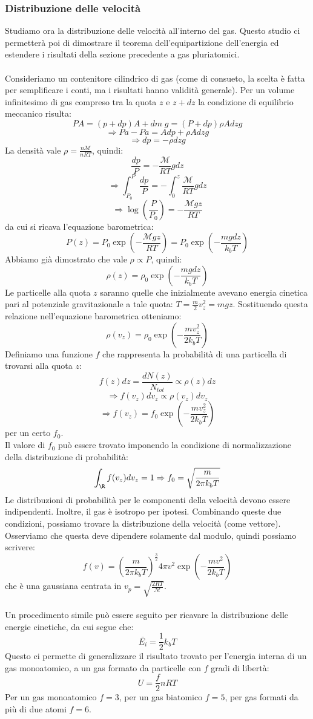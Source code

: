 \documentclass{article}
\begin{document}
\subsubsection{Distribuzione delle velocità}
Studiamo ora la distribuzione delle velocità all'interno del gas. Questo studio ci permetterà poi di dimostrare il teorema dell'equipartizione dell'energia ed estendere i risultati della sezione precedente a gas pluriatomici.\\\\
Consideriamo un contenitore cilindrico di gas (come di consueto, la scelta è fatta per semplificare i conti, ma i risultati hanno validità generale). Per un volume infinitesimo di gas compreso tra la quota $z$ e $z+dz$ la condizione di equilibrio meccanico risulta:
$$ PA=(p+dp)A+dm\;g = (P+dp)\rho Adzg $$
$$ \Rightarrow Pa-Pa = Adp+\rho Adzg$$
$$ \Rightarrow dp = -\rho dzg $$
La densità vale $ \rho=\frac{n\mathcal{M}}{nRT} $, quindi:
$$ \frac{dp}{P} = -\frac{\mathcal{M}}{RT}gdz $$
$$\Rightarrow \int_{P_0}^P\frac{dp}{P}=-\int_0^z\frac{\mathcal{M}}{RT}gdz  $$
$$\Rightarrow \log\left(\frac{P}{P_0}\right)=-\frac{\mathcal{M}gz}{RT} $$
da cui si ricava l'equazione barometrica:
$$P(z)=P_0\exp\left(-\frac{\mathcal{M}gz}{RT}\right)=P_0\exp\left(-\frac{mgdz}{k_bT}\right)$$
Abbiamo già dimostrato che vale $\rho\propto P$, quindi:
$$ \rho(z)=\rho_0\exp\left(-\frac{mgdz}{k_bT}\right)$$
Le particelle alla quota $z$ saranno quelle che inizialmente avevano energia cinetica pari al potenziale gravitazionale a tale quota: $T=\frac{m}{2}v_z^2=mgz$. Sostituendo questa relazione nell'equazione barometrica otteniamo:
$$ \rho(v_z)=\rho_0\exp\left(-\frac{mv_z^2}{2k_bT}\right) $$
Definiamo una funzione $f$ che rappresenta la probabilità di una particella di trovarsi alla quota $z$: $$f(z)dz=\frac{dN(z)}{N_{tot}}\propto\rho(z)dz$$
$$\Rightarrow f(v_z)dv_z\propto\rho(v_z)dv_z $$
$$\Rightarrow f(v_z)=f_0\exp\left(-\frac{mv_z^2}{2k_bT}\right) $$
per un certo $f_0$.\\
Il valore di $f_0$ può essere trovato imponendo la condizione di normalizzazione della distribuzione di probabilità:
$$ \int_\R f(v_z)dv_z=1\Rightarrow f_0=\sqrt{\frac{m}{2\pi k_bT}} $$
Le distribuzioni di probabilità per le componenti della velocità devono essere indipendenti. Inoltre, il gas è isotropo per ipotesi. Combinando queste due condizioni, possiamo trovare la distribuzione della velocità (come vettore). Osserviamo che questa deve dipendere solamente dal modulo, quindi possiamo scrivere:
$$ f(v)=\left(\frac{m}{2\pi k_bT}\right)^{\frac{3}{2}}4\pi v^2\exp\left(-\frac{mv^2}{2k_bT}\right) $$
che è una gaussiana centrata in $v_p=\sqrt{\frac{2RT}{\mathcal{M}}}$.\\\\
Un procedimento simile può essere seguito per ricavare la distribuzione delle energie cinetiche, da cui segue che:
$$ \bar{E_i}=\frac{1}{2}k_bT $$
Questo ci permette di generalizzare il risultato trovato per l'energia interna di un gas monoatomico, a un gas formato da particelle con $f$ gradi di libertà:
$$ U = \frac{f}{2}nRT $$
Per un gas monoatomico $f=3$, per un gas biatomico $f=5$, per gas formati da più di due atomi $f=6$.
\end{document}
